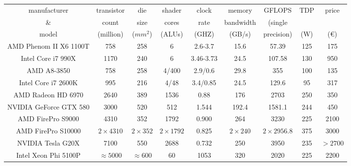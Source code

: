 \documentclass[prodmode,acmtecs]{acmsmall}
\begin{document}
\begin{table}[h]
{
\begin{tabular}{|c|c|c|c|c|c|c|c|c|}
\hline
manufacturer           & transistor & die      & shader & clock      & memory    & GFLOPS     & TDP & price   \\
\&                     & count      & size     & cores  & rate       & bandwidth & (single    &     &         \\
model                  & (million)  & ($mm^2$) & (ALUs) & (GHZ)      & (GB/s)    & precision) & (W) & (\euro) \\
\hline
\hline
AMD Phenom II X6 1100T & 758        & 258      & 6      & 2.6-3.7    & 15.6     & 57.39 & 125 & 175 \\
\hline
Intel Core i7 990X     & 1170       & 240      & 6      & 3.46-3.73  & 24.5     & 107.58 & 130 & 950 \\
\hline
\hline
AMD A8-3850            & 758        & 258      & 4/400  & 2.9/0.6    & 29.8     & 355    & 100  & 135 \\
\hline
Intel Core i7 2600K    & 995        & 216      & 4/48   & 3.4/0.85 & 24.5  & 129.6 & 95  & 317 \\
\hline
\hline
AMD Radeon HD 6970     & 2640       & 389      & 1536   & 0.88       & 176    & 2703 & 250 & 350 \\
\hline
NVIDIA GeForce GTX 580 & 3000       & 520      & 512    & 1.544      & 192.4  & 1581.1 & 244 & 450 \\
\hline
\hline
AMD FirePro S9000      &         4310  &         352  &         1792  & 0.900 &         264  &         3230    & 225 & 2100 \\
\hline
AMD FirePro S10000     & $2\times4310$ & $2\times352$ & $2\times1792$ & 0.825 & $2\times240$ & $2\times2956.8$ & 375 & 3000 \\
\hline
NVIDIA Tesla G20X      & 7100          & 550          & 2688          & 0.732 & 250          & 3950            & 235 & $>2700$ \\
\hline
\hline
Intel Xeon Phi 5100P   & $\approx5000$ & $\approx600$ & 60            & 1053  & 320          & 2020            & 225 &  2200 \\
\hline

\end{tabular}
}
\end{table}
\end{document}
